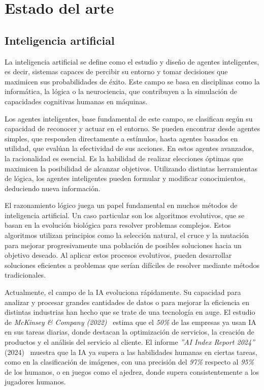 \chapter{Estado del arte}
\label{ch:estado-arte}

\section{Inteligencia artificial}

La inteligencia artificial se define como el estudio y diseño de agentes inteligentes, es decir, sistemas capaces de percibir su entorno y tomar decisiones que maximicen sus probabilidades de éxito. Este campo se basa en disciplinas como la informática, la lógica o la neurociencia, que contribuyen a la simulación de capacidades cognitivas humanas en máquinas.

Los agentes inteligentes, base fundamental de este campo, se clasifican según su capacidad de reconocer y actuar en el entorno. Se pueden encontrar desde agentes simples, que responden directamente a estímulos, hasta agentes basados en utilidad, que evalúan la efectividad de sus acciones. En estos agentes avanzados, la racionalidad es esencial. Es la habilidad de realizar elecciones óptimas que maximicen la posibilidad de alcanzar objetivos. Utilizando distintas herramientas de lógica, los agentes inteligentes pueden formular y modificar conocimientos, deduciendo nueva información.

El razonamiento lógico juega un papel fundamental en muchos métodos de inteligencia artificial. Un caso particular son los algoritmos evolutivos, que se basan en la evolución biológica para resolver problemas complejos. Estos algoritmos utilizan principios como la selección natural, el cruce y la mutación para mejorar progresivamente una población de posibles soluciones hacia un objetivo deseado. Al aplicar estos procesos evolutivos, pueden desarrollar soluciones eficientes a problemas que serían difíciles de resolver mediante métodos tradicionales.

Actualmente, el campo de la IA evoluciona rápidamente. Su capacidad para analizar y procesar grandes cantidades de datos o para mejorar la eficiencia en distintas industrias han hecho que se trate de una tecnología en auge. El estudio de \textit{McKinsey \& Company (2022)}~\cite{mckinsey2022ai} estima que el \textit{50\%} de las empresas ya usan IA en sus tareas diarias, donde destacan la optimización de servicios, la creación de productos y el análisis del servicio al cliente.
\newpage
El informe \textit{''AI Index Report 2024''} (2024)~\cite{aiindex2024} muestra que la IA ya supera a las habilidades humanas en ciertas tareas, como en la clasificación de imágenes, con una precisión del \textit{97\%} respecto al \textit{95\%} de los humanos, o en juegos como el ajedrez, donde supera consistentemente a los jugadores humanos.

